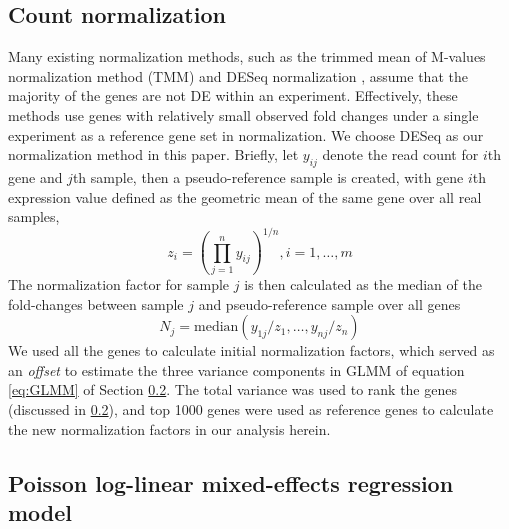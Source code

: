 \documentclass[11pt, a4paper]{article}
\begin{document}

\subsection{Count normalization}\label{section:countNormalization}

Many existing normalization methods, such as the trimmed mean of M-values normalization method (TMM) \citep{robinson2010scaling} and DESeq normalization \citep{anders2010differential}, assume that the majority of the genes are not DE within an experiment. Effectively, these methods use genes with relatively small observed fold changes under a single experiment as a reference gene set in normalization. We choose DESeq \citep{anders2010differential} as our normalization method in this paper. Briefly, let $y_{ij}$ denote the read count for $i$th gene and $j$th sample, then a pseudo-reference sample is created, with gene $i$th expression value defined as the geometric mean of the same gene over all real samples, 
\[ z_i = (\prod_{j=1}^ny_{ij})^{1/n},  i=1, \ldots, m \]
 The normalization factor for sample $j$ is then calculated as the median of the fold-changes between sample $j$ and pseudo-reference sample over all genes
  \[N_j = \text{median}(y_{1j}/z_1, \ldots, y_{nj}/z_n)\]
  We used all the genes to calculate initial normalization factors, which served as an \textit{offset} to estimate the three variance components in GLMM of equation \ref{eq:GLMM} of Section \ref{subsection:OurMethod}. The total variance was used to rank the genes (discussed in \ref{subsection:OurMethod}), and top 1000 genes were used as reference genes to calculate the new normalization factors in our analysis herein. 

\subsection{Poisson log-linear mixed-effects regression model}\label{subsection:OurMethod} 
\end{document}
